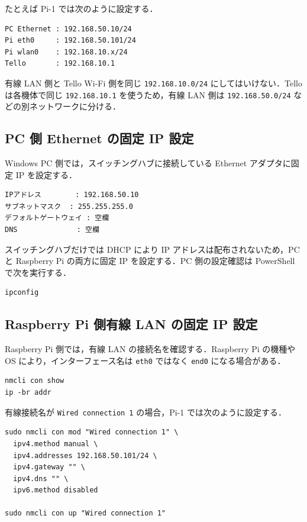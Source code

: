 たとえば Pi-1 では次のように設定する．

\begin{lstlisting}
PC Ethernet : 192.168.50.10/24
Pi eth0     : 192.168.50.101/24
Pi wlan0    : 192.168.10.x/24
Tello       : 192.168.10.1
\end{lstlisting}

有線 LAN 側と Tello Wi-Fi 側を同じ \texttt{192.168.10.0/24} にしてはいけない．Tello は各機体で同じ \texttt{192.168.10.1} を使うため，有線 LAN 側は \texttt{192.168.50.0/24} などの別ネットワークに分ける．

\subsection{PC 側 Ethernet の固定 IP 設定}

Windows PC 側では，スイッチングハブに接続している Ethernet アダプタに固定 IP を設定する．

\begin{lstlisting}
IPアドレス        : 192.168.50.10
サブネットマスク  : 255.255.255.0
デフォルトゲートウェイ : 空欄
DNS              : 空欄
\end{lstlisting}

スイッチングハブだけでは DHCP により IP アドレスは配布されないため，PC と Raspberry Pi の両方に固定 IP を設定する．PC 側の設定確認は PowerShell で次を実行する．

\begin{lstlisting}
ipconfig
\end{lstlisting}

\subsection{Raspberry Pi 側有線 LAN の固定 IP 設定}

Raspberry Pi 側では，有線 LAN の接続名を確認する．Raspberry Pi の機種や OS により，インターフェース名は \texttt{eth0} ではなく \texttt{end0} になる場合がある．

\begin{lstlisting}
nmcli con show
ip -br addr
\end{lstlisting}

有線接続名が \texttt{Wired connection 1} の場合，Pi-1 では次のように設定する．

\begin{lstlisting}
sudo nmcli con mod "Wired connection 1" \
  ipv4.method manual \
  ipv4.addresses 192.168.50.101/24 \
  ipv4.gateway "" \
  ipv4.dns "" \
  ipv6.method disabled

sudo nmcli con up "Wired connection 1"
\end{lstlisting}

